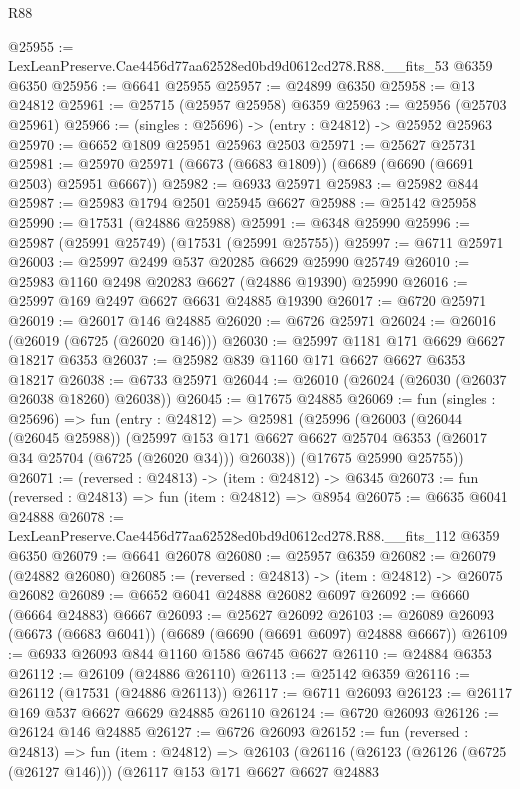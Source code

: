 \begin{lexlean}{R88}
\begin{coremodule}
@25955 := LexLeanPreserve.Cae4456d77aa62528ed0bd9d0612cd278.R88.__fits_53 @6359 @6350
@25956 := @6641 @25955
@25957 := @24899 @6350
@25958 := @13 @24812
@25961 := @25715 (@25957 @25958) @6359
@25963 := @25956 (@25703 @25961)
@25966 := (singles : @25696) -> (entry : @24812) -> @25952 @25963
@25970 := @6652 @1809 @25951 @25963 @2503
@25971 := @25627 @25731
@25981 := @25970 @25971 (@6673 (@6683 @1809)) (@6689 (@6690 (@6691 @2503) @25951 @6667))
@25982 := @6933 @25971
@25983 := @25982 @844
@25987 := @25983 @1794 @2501 @25945 @6627
@25988 := @25142 @25958
@25990 := @17531 (@24886 @25988)
@25991 := @6348 @25990
@25996 := @25987 (@25991 @25749) (@17531 (@25991 @25755))
@25997 := @6711 @25971
@26003 := @25997 @2499 @537 @20285 @6629 @25990 @25749
@26010 := @25983 @1160 @2498 @20283 @6627 (@24886 @19390) @25990
@26016 := @25997 @169 @2497 @6627 @6631 @24885 @19390
@26017 := @6720 @25971
@26019 := @26017 @146 @24885
@26020 := @6726 @25971
@26024 := @26016 (@26019 (@6725 (@26020 @146)))
@26030 := @25997 @1181 @171 @6629 @6627 @18217 @6353
@26037 := @25982 @839 @1160 @171 @6627 @6627 @6353 @18217
@26038 := @6733 @25971
@26044 := @26010 (@26024 (@26030 (@26037 @26038 @18260) @26038))
@26045 := @17675 @24885
@26069 := fun (singles : @25696) =>
  fun (entry : @24812) =>
  @25981
    (@25996
      (@26003
        (@26044 (@26045 @25988))
        (@25997 @153 @171 @6627 @6627 @25704 @6353 (@26017 @34 @25704 (@6725 (@26020 @34))) @26038))
      (@17675 @25990 @25755))
@26071 := (reversed : @24813) -> (item : @24812) -> @6345
@26073 := fun (reversed : @24813) => fun (item : @24812) => @8954
@26075 := @6635 @6041 @24888
@26078 := LexLeanPreserve.Cae4456d77aa62528ed0bd9d0612cd278.R88.__fits_112 @6359 @6350
@26079 := @6641 @26078
@26080 := @25957 @6359
@26082 := @26079 (@24882 @26080)
@26085 := (reversed : @24813) -> (item : @24812) -> @26075 @26082
@26089 := @6652 @6041 @24888 @26082 @6097
@26092 := @6660 (@6664 @24883) @6667
@26093 := @25627 @26092
@26103 := @26089 @26093 (@6673 (@6683 @6041)) (@6689 (@6690 (@6691 @6097) @24888 @6667))
@26109 := @6933 @26093 @844 @1160 @1586 @6745 @6627
@26110 := @24884 @6353
@26112 := @26109 (@24886 @26110)
@26113 := @25142 @6359
@26116 := @26112 (@17531 (@24886 @26113))
@26117 := @6711 @26093
@26123 := @26117 @169 @537 @6627 @6629 @24885 @26110
@26124 := @6720 @26093
@26126 := @26124 @146 @24885
@26127 := @6726 @26093
@26152 := fun (reversed : @24813) =>
  fun (item : @24812) =>
  @26103
    (@26116
      (@26123
        (@26126 (@6725 (@26127 @146)))
        (@26117
          @153
          @171
          @6627
          @6627
          @24883

\end{coremodule}
\end{lexlean}
